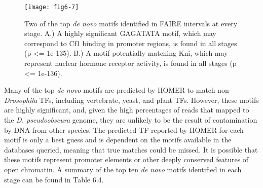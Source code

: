 \begin{figure}
\centering
\texttt{[image: fig6-7]}
\caption{Two of the top \emph{de novo} motifs identified in FAIRE intervals at every stage. A.) A highly significant GAGATATA motif, which may correspond to Cf1 binding in promoter regions, is found in all stages (p <= 1e-135). B.) A motif potentially matching Kni, which may represent nuclear hormone receptor activity, is found in all stages (p <= 1e-136).}
\label{Figure 6.7}
\end{figure}

Many of the top \emph{de novo} motifs are predicted by HOMER to match non-\emph{Drosophila} TFs, including vertebrate, yeast, and plant TFs. However, these motifs are highly significant, and, given the high percentages of reads that mapped to the \emph{D. pseudoobscura} genome, they are unlikely to be the result of contamination by DNA from other species. The predicted TF reported by HOMER for each motif is only a best guess and is dependent on the motifs available in the databases queried, meaning that true matches could be missed. It is possible that these motifs represent promoter elements or other deeply conserved features of open chromatin. A summary of the top ten \emph{de novo} motifs identified in each stage can be found in Table 6.4.\\

